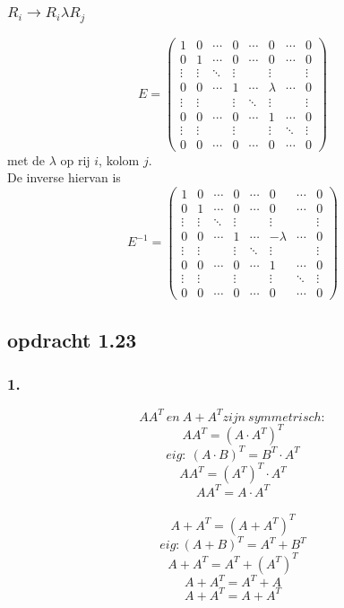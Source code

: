 \documentclass[lineaire_algebra_oplossingen.tex]{subfiles}
\begin{document}
\subsubsection*{$R_i \rightarrow R_i \lambda R_j$}
\[
E=
\begin{pmatrix}
1 & 0 & \cdots & 0 & \cdots & 0 & \cdots & 0\\
0 & 1 & \cdots & 0 & \cdots & 0 & \cdots & 0\\
\vdots & \vdots & \ddots & \vdots& & \vdots & &\vdots\\
0 & 0 & \cdots & 1 & \cdots & \lambda & \cdots & 0\\
\vdots & \vdots & & \vdots& \ddots & \vdots & &\vdots\\
0 & 0 & \cdots & 0 & \cdots & 1 & \cdots & 0\\
\vdots & \vdots & & \vdots & & \vdots & \ddots & \vdots\\
0 & 0 & \cdots & 0 & \cdots & 0 & \cdots & 0
\end{pmatrix}
\]
met de $\lambda$ op rij $i$, kolom $j$.\\
De inverse hiervan is 
\[
E^{-1}=
\begin{pmatrix}
1 & 0 & \cdots & 0 & \cdots & 0 & \cdots & 0\\
0 & 1 & \cdots & 0 & \cdots & 0 & \cdots & 0\\
\vdots & \vdots & \ddots & \vdots& & \vdots & &\vdots\\
0 & 0 & \cdots & 1 & \cdots & -\lambda & \cdots & 0\\
\vdots & \vdots & & \vdots& \ddots & \vdots & &\vdots\\
0 & 0 & \cdots & 0 & \cdots & 1 & \cdots & 0\\
\vdots & \vdots & & \vdots & & \vdots & \ddots & \vdots\\
0 & 0 & \cdots & 0 & \cdots & 0 & \cdots & 0
\end{pmatrix}
\]

\subsection{opdracht 1.23}
\subsubsection*{1.}
\[
AA^T \ en \ A + A^T zijn \ symmetrisch:
\]
\[
AA^T = (A\cdot A^T)^T
\]
$$eig: \ (A\cdot B)^T = B^T \cdot A^T $$
$$AA^T = (A^T)^T \cdot A^T$$
$$AA^T = A \cdot A^T$$
\\
$$A +A^T = (A +A^T)^T$$
$$eig: (A+B)^T = A^T + B^T$$
$$A +A^T = A^T + (A^T)^T$$
$$A +A^T = A^T + A$$
$$A +A^T = A + A^T$$
\end{document}
